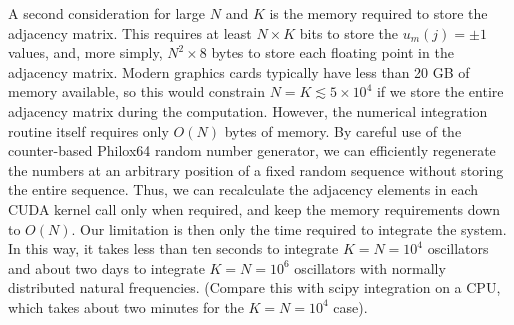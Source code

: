 \documentclass[aps,pre,amsmath,amssymb,floatfix,onecolumn,notitlepage,10pt]{revtex4-1}
\begin{document}
A second consideration for large $N$ and $K$ is the memory required to store the adjacency matrix. This requires at least $N\times K$ bits to store the $u_m(j)=\pm 1$ values, and, more simply, $N^2 \times 8$ bytes to store each floating point in the adjacency matrix.  Modern graphics cards typically have less than 20 GB of memory available, so this would constrain $N=K\lesssim 5\times 10^4$ if we store the entire adjacency matrix during the computation.  However, the numerical integration routine itself requires only $O(N)$ bytes of memory.  By careful use of the counter-based Philox64 random number generator, we can efficiently regenerate the numbers at an arbitrary position of a fixed random sequence without storing the entire sequence.  Thus, we can recalculate the adjacency elements in each CUDA kernel call only when required, and keep the memory requirements down to $O(N)$. Our limitation is then only the time required to integrate the system. In this way, it takes less than ten seconds to integrate $K=N=10^4$ oscillators and about two days to integrate $K=N=10^6$ oscillators with normally distributed natural frequencies. (Compare this with scipy integration on a CPU, which takes about two minutes for the $K=N=10^4$ case).
\end{document}
